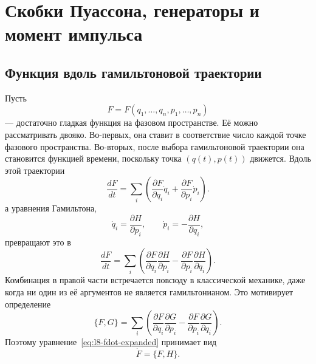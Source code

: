 \chapter{Скобки Пуассона, генераторы и момент импульса}


\section{Функция вдоль гамильтоновой траектории}

Пусть
\[
  F=F(q_1,\ldots,q_n,p_1,\ldots,p_n)
\]
— достаточно гладкая функция на фазовом пространстве. Её можно рассматривать двояко. Во-первых, она ставит в соответствие число каждой точке фазового пространства. Во-вторых, после выбора гамильтоновой траектории она становится функцией времени, поскольку точка \((q(t),p(t))\) движется. Вдоль этой траектории
\begin{equation}
  \frac{dF}{dt}
  =
  \sum_i\left(
    \frac{\partial F}{\partial q_i}\dot q_i
    +\frac{\partial F}{\partial p_i}\dot p_i
  \right).
  \label{eq:l8-chain-rule}
\end{equation}
а уравнения Гамильтона,
\begin{equation}
  \dot q_i=\frac{\partial H}{\partial p_i},
  \qquad
  \dot p_i=-\frac{\partial H}{\partial q_i},
  \label{eq:l8-hamilton-equations}
\end{equation}
превращают это в
\begin{equation}
  \frac{dF}{dt}
  =
  \sum_i\left(
    \frac{\partial F}{\partial q_i}
    \frac{\partial H}{\partial p_i}
    -
    \frac{\partial F}{\partial p_i}
    \frac{\partial H}{\partial q_i}
  \right).
  \label{eq:l8-fdot-expanded}
\end{equation}
Комбинация в правой части встречается повсюду в классической механике, даже когда ни один из её аргументов не является гамильтонианом. Это мотивирует определение
\begin{equation}
  \boxed{
  \{F,G\}
  =
  \sum_i\left(
    \frac{\partial F}{\partial q_i}
    \frac{\partial G}{\partial p_i}
    -
    \frac{\partial F}{\partial p_i}
    \frac{\partial G}{\partial q_i}
  \right).}
  \label{eq:l8-poisson-definition}
\end{equation}
Поэтому уравнение~\eqref{eq:l8-fdot-expanded} принимает вид
\begin{equation}
  \boxed{\dot F=\{F,H\}.}
  \label{eq:l8-time-generator}
\end{equation}

